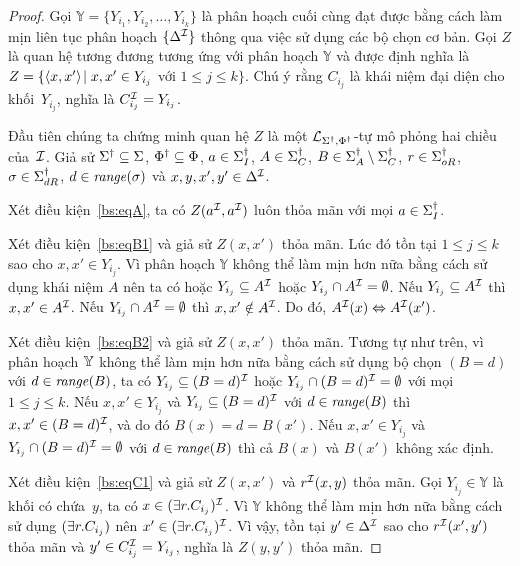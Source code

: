 \begin{proof}
	Gọi $\mathbb{Y} = \{Y_{i_1}, Y_{i_2}, \ldots ,Y_{i_k}\}$ là phân hoạch cuối cùng đạt được bằng cách làm mịn liên tục phân hoạch $\{\Delta^{\mathcal{I}}\}$ thông qua việc sử dụng các bộ chọn cơ bản. Gọi $Z$ là quan hệ tương đương tương ứng với phân hoạch $\mathbb{Y}$ và được định nghĩa là $Z = \{\left\langle x,x'\right\rangle\! \mid x,x' \in Y_{i_j}$ với $1 \leq j \leq k\}$. Chú ý rằng $C_{i_j}$ là khái niệm đại diện cho khối~$Y_{i_j}$, nghĩa là $C_{i_j}^{\mathcal{I}} = Y_{i_j}$.
	
	Đầu tiên chúng ta chứng minh quan hệ $Z$ là một $\mathcal{L}_{\Sigma^\dag,\Phi^\dag}$-tự mô phỏng hai chiều của~$\mathcal{I}$. Giả sử $\Sigma^\dag \subseteq \Sigma$, $\Phi^\dag \subseteq \Phi$, $a \in \Sigma^\dag_I$, $A \in \Sigma^\dag_C$, $B \in \Sigma^\dag_A\setminus\Sigma^\dag_C$, $r \in \Sigma^\dag_{oR}$, $\sigma \in \Sigma^\dag_{dR}$, $d \in \mathit{range}(\sigma)$ và $x,y,x',y' \in \Delta^{\mathcal{I}}$.
	
	\semiItem{}Xét điều kiện~\eqref{bs:eqA}, ta có $Z(a^{\mathcal{I}}, a^{\mathcal{I}})$ luôn thỏa mãn với mọi $a \in \Sigma^\dag_I$.
	
	\semiItem{}Xét điều kiện~\eqref{bs:eqB1} và giả sử $Z(x,x')$ thỏa mãn. Lúc đó tồn tại $1 \leq j \leq k$ sao cho $x, x' \in Y_{i_j}$.
	Vì phân hoạch $\mathbb{Y}$ không thể làm mịn hơn nữa bằng cách sử dụng khái niệm $A$ nên ta có hoặc $Y_{i_j} \subseteq A^{\mathcal{I}}$ hoặc $Y_{i_j} \cap A^{\mathcal{I}} = \emptyset$.
	Nếu $Y_{i_j} \subseteq A^{\mathcal{I}}$ thì $x, x' \in A^{\mathcal{I}}$.
	Nếu $Y_{i_j} \cap A^{\mathcal{I}} = \emptyset$ thì $x, x' \notin A^{\mathcal{I}}$. Do đó, $A^{\mathcal{I}}(x) \Leftrightarrow A^{\mathcal{I}}(x')$.
	
	\semiItem Xét điều kiện~\eqref{bs:eqB2} và giả sử $Z(x,x')$ thỏa mãn. Tương tự như trên, vì phân hoạch $\mathbb{Y}$ không thể làm mịn hơn nữa bằng cách sử dụng bộ chọn $(B=d)$ với $d \in \mathit{range}(B)$, ta có $Y_{i_j} \subseteq (B=d)^{\mathcal{I}}$ hoặc $Y_{i_j} \cap (B=d)^{\mathcal{I}} = \emptyset$ với mọi $1 \leq j \leq k$. Nếu $x, x' \in Y_{i_j}$ và $Y_{i_j} \subseteq (B=d)^{\mathcal{I}}$ với $d \in \mathit{range}(B)$ thì $x, x' \in (B=d)^{\mathcal{I}}$, và do đó $B(x) = d = B(x')$. Nếu $x, x' \in Y_{i_j}$ và $Y_{i_j} \cap (B=d)^{\mathcal{I}} = \emptyset$ với $d \in \mathit{range}(B)$ thì cả $B(x)$ và $B(x')$ không xác định.
	
	\semiItem{}Xét điều kiện~\eqref{bs:eqC1} và giả sử $Z(x,x')$ và $r^{\mathcal{I}}(x,y)$ thỏa mãn. Gọi $Y_{i_j} \in \mathbb{Y}$ là khối có chứa~$y$, ta có $x \in (\exists r.C_{i_j})^{\mathcal{I}}$. Vì $\mathbb{Y}$ không thể làm mịn hơn nữa bằng cách sử dụng $(\exists r.C_{i_j})$ nên $x' \in (\exists r.C_{i_j})^{\mathcal{I}}$. Vì vậy, tồn tại $y' \in \Delta^{\mathcal{I}}$ sao cho $r^{\mathcal{I}}(x',y')$ thỏa mãn và $y' \in C_{i_j}^{\mathcal{I}} = Y_{i_j}$, nghĩa là $Z(y,y')$ thỏa mãn.
	

\end{proof}

